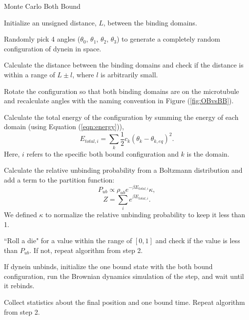 \begin{algorithm}[H]
	\caption{Monte Carlo Both Bound}
	\label{alg:MonteCarlo}

	\begin{alg}
	\item Initialize an unsigned distance, $L$, between the binding domains.
	
	\item Randomly pick 4 angles ($\theta_0$, $\theta_1$, $\theta_2$, $\theta_3$) to generate a completely random configuration of dynein in space.
	
	
	\item Calculate the distance between the binding domains and check if the distance is within a range of $L\pm l$, where $l$ is arbitrarily small.
	
	\item Rotate the configuration so that both binding domains are on the microtubule and recalculate angles with the naming convention in Figure (\ref{fig:OBvsBB}).

	
	\item Calculate the total energy of the configuration by summing the energy of each domain (using Equation (\ref{eqn:energy})),
	\begin{equation}
		E_{total, i}=\sum_{k}\frac{1}{2}c_k(\theta_k-\theta_{k,eq})^2.
	\end{equation}
	Here, $i$ refers to the specific both bound configuration and $k$ is the domain.	
	
	\item Calculate the relative unbinding probability from a Boltzmann distribution and add a term to the partition function:
	\begin{equation}
		P_{ub} \propto \rho_{ub}e^{-\beta E_{total, i}}\kappa,
	\end{equation}
	\begin{equation}
		Z=\sum_{i}e^{\beta E_{total, i}}.
	\end{equation}
	We defined $\kappa$ to normalize the relative unbinding probability to keep it less than 1. 
	
	\item ``Roll a die" for a value within the range of $[0,1]$ and check if the value is less than $P_{ub}$. If not, repeat algorithm from step 2.
	
	\item If dynein unbinds, initialize the one bound state with the both bound configuration, run the Brownian dynamics simulation of the step, and wait until it rebinds.
	
	\item Collect statistics about the final position and one bound time. Repeat algorithm from step 2. 
	
	\end{alg}

\end{algorithm}

